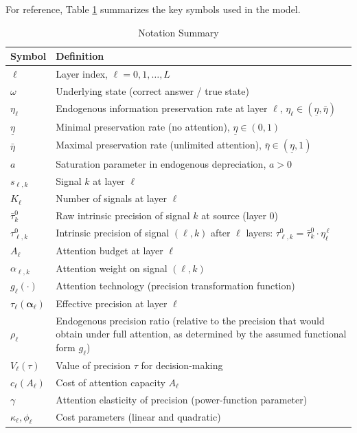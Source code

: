 For reference, Table \ref{tab:notation} summarizes the key symbols used in the model.

\begin{table}[htbp]
\centering
\caption{Notation Summary}
\label{tab:notation}
\begin{tabular}{@{}>{\raggedright\arraybackslash}p{2.5cm}>{\raggedright\arraybackslash}p{10cm}@{}}
\toprule
\textbf{Symbol} & \textbf{Definition} \\
\midrule
$\ell$ & Layer index, $\ell = 0, 1, \ldots, L$ \\
$\omega$ & Underlying state (correct answer / true state) \\
$\eta_\ell$ & Endogenous information preservation rate at layer $\ell$, $\eta_\ell \in (\underline{\eta}, \bar{\eta})$ \\
$\underline{\eta}$ & Minimal preservation rate (no attention), $\underline{\eta} \in (0,1)$ \\
$\bar{\eta}$ & Maximal preservation rate (unlimited attention), $\bar{\eta} \in (\underline{\eta}, 1)$ \\
$a$ & Saturation parameter in endogenous depreciation, $a > 0$ \\
$s_{\ell,k}$ & Signal $k$ at layer $\ell$ \\
$K_\ell$ & Number of signals at layer $\ell$ \\
$\bar{\tau}^0_k$ & Raw intrinsic precision of signal $k$ at source (layer $0$) \\
$\tau^0_{\ell,k}$ & Intrinsic precision of signal $(\ell, k)$ after $\ell$ layers: $\tau^0_{\ell,k} = \bar{\tau}^0_k \cdot \eta_{\ell}^{\,\ell}$ \\
$A_\ell$ & Attention budget at layer $\ell$ \\
$\alpha_{\ell,k}$ & Attention weight on signal $(\ell, k)$ \\
$g_\ell(\cdot)$ & Attention technology (precision transformation function) \\
$\tau_\ell(\boldsymbol{\alpha}_\ell)$ & Effective precision at layer $\ell$ \\
$\rho_\ell$ & Endogenous precision ratio (relative to the precision that would obtain under full attention, as determined by the assumed functional form $g_\ell$) \\
$V_\ell(\tau)$ & Value of precision $\tau$ for decision-making \\
$c_\ell(A_\ell)$ & Cost of attention capacity $A_\ell$ \\
$\gamma$ & Attention elasticity of precision (power-function parameter) \\
$\kappa_\ell, \phi_\ell$ & Cost parameters (linear and quadratic) \\
\bottomrule
\end{tabular}
\end{table}
